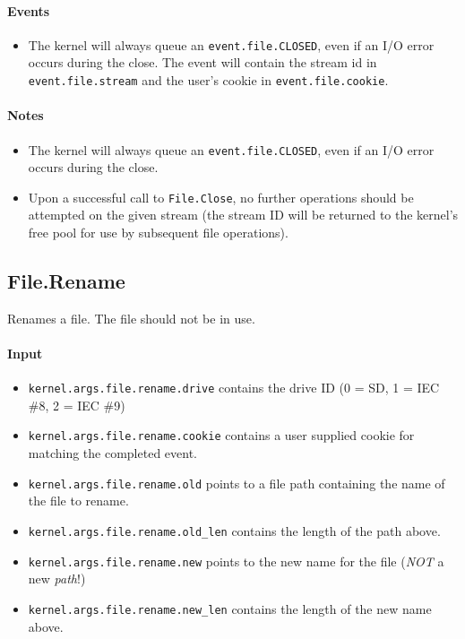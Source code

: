 \paragraph{Events}
\begin{itemize}
\item The kernel will always queue an \verb+event.file.CLOSED+, even if an I/O error occurs during the close.  The event will contain the stream id in \verb+event.file.stream+ and the user's cookie in \verb+event.file.cookie+.
\end{itemize}

\paragraph{Notes}
\begin{itemize}
\item The kernel will always queue an \verb+event.file.CLOSED+, even if an I/O error occurs during the close.
\item Upon a successful call to \verb+File.Close+, no further operations should be attempted on the given stream (the stream ID will be returned to the kernel's free pool for use by subsequent file operations).
\end{itemize}

\subsection*{File.Rename}
Renames a file.  The file should not be in use.

\paragraph{Input}
\begin{itemize}
\item \verb+kernel.args.file.rename.drive+ contains the drive ID (0 = SD, 1 = IEC \#8, 2 = IEC \#9)
\item \verb+kernel.args.file.rename.cookie+ contains a user supplied cookie for matching the completed event.
\item \verb+kernel.args.file.rename.old+ points to a file path containing the name of the file to rename.
\item \verb+kernel.args.file.rename.old_len+ contains the length of the path above.
\item \verb+kernel.args.file.rename.new+ points to the new name for the file ({\em NOT} a new {\em path}!)
\item \verb+kernel.args.file.rename.new_len+ contains the length of the new name above.
\end{itemize}

